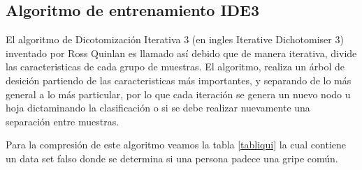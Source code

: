 \documentclass[twoside,spanish,ESP,MSc]{plantillaLabUPV}
\theoremstyle{definition}
\begin{document}
\subsection{Algoritmo de entrenamiento IDE3}

El algoritmo de Dicotomización Iterativa 3 (en ingles Iterative Dichotomiser 3) inventado por Ross Quinlan es llamado así debido que de manera iterativa, divide las caracteristicas de cada grupo de muestras. El algoritmo, realiza un árbol de desición partiendo de las caracteristicas más importantes, y separando de lo más general a lo más particular, por lo que cada iteración se genera un nuevo nodo u hoja dictaminando la clasificación o si se debe realizar nuevamente una separación entre muestras.

Para la compresión de este algoritmo veamos la tabla \ref{tabliqui}
la cual contiene un data set falso donde se determina si una persona padece una gripe común. 
\end{document}
